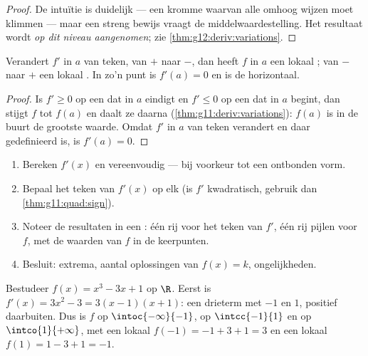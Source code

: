 \begin{proof}
De intuïtie is duidelijk --- een kromme waarvan alle  omhoog wijzen
moet klimmen --- maar een streng bewijs vraagt de middelwaardestelling. Het
resultaat wordt \emph{op dit niveau aangenomen}; zie
\cref{thm:g12:deriv:variations}.
\end{proof}

\begin{proposition}[Extrema]\label{prop:g11:deriv:extrema}
Verandert $f'$ in $a$ van teken, van $+$ naar $-$, dan heeft $f$ in $a$ een
lokaal ; van $-$ naar $+$ een lokaal . In zo'n punt is
$f'(a) = 0$ en is de  horizontaal.
\end{proposition}

\begin{proof}
Is $f' \geq 0$ op een  dat in $a$ eindigt en $f' \leq 0$ op een
 dat in $a$ begint, dan stijgt $f$ tot $f(a)$ en daalt ze daarna
(\cref{thm:g11:deriv:variations}): $f(a)$ is in de buurt de grootste waarde.
Omdat $f'$ in $a$ van teken verandert en daar gedefinieerd is, is
$f'(a) = 0$.
\end{proof}

\begin{method}\label{met:g11:deriv:study}
\begin{enumerate}
  \item Bereken $f'(x)$ en vereenvoudig --- bij voorkeur tot een ontbonden
        vorm.
  \item Bepaal het teken van $f'(x)$ op elk  (is $f'$ kwadratisch,
        gebruik dan \cref{thm:g11:quad:sign}).
  \item Noteer de resultaten in een \emph{}: één rij voor het
        teken van $f'$, één rij pijlen voor $f$, met de waarden van $f$ in de
        keerpunten.
  \item Besluit: extrema, aantal oplossingen van $f(x) = k$, ongelijkheden.
\end{enumerate}
\end{method}

\begin{example}\label{ex:g11:deriv:study}
Bestudeer $f(x) = x^3 - 3x + 1$ op $\R$. Eerst is
$f'(x) = 3x^2 - 3 = 3(x-1)(x+1)$: een drieterm met  $-1$ en $1$,
positief daarbuiten. Dus is $f$  op $\intoc{-\infty}{-1}$,  op
$\intcc{-1}{1}$ en  op $\intco{1}{+\infty}$, met een lokaal 
$f(-1) = -1 + 3 + 1 = 3$ en een lokaal  $f(1) = 1 - 3 + 1 = -1$.
\end{example}

